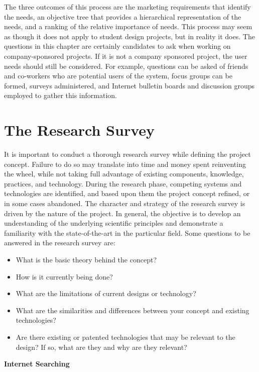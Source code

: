 The three outcomes of this process are the marketing requirements that
identify the needs, an objective tree that provides a hierarchical
representation of the needs, and a ranking of the relative importance of
needs. This process may seem as though it does not apply to student
design projects, but in reality it does. The questions in this chapter
are certainly candidates to ask when working on company-sponsored
projects. If it is not a company sponsored project, the user needs
should still be considered. For example, questions can be asked of
friends and co-workers who are potential users of the system, focus
groups can be formed, surveys administered, and Internet bulletin boards
and discussion groups employed to gather this information.

\section{The Research Survey}
\label{section:the-research-survey}

It is important to conduct a thorough research survey while defining the
project concept. Failure to do so may translate into time and money
spent reinventing the wheel, while not taking full advantage of existing
components, knowledge, practices, and technology. During the research
phase, competing systems and technologies are identified, and based upon
them the project concept refined, or in some cases abandoned. The
character and strategy of the research survey is driven by the nature of
the project. In general, the objective is to develop an understanding of
the underlying scientific principles and demonstrate a familiarity with
the state-of-the-art in the particular field. Some questions to be
answered in the research survey are:

\begin{itemize}
\item
  What is the basic theory behind the concept?
\item
  How is it currently being done?
\item
  What are the limitations of current designs or technology?
\item
  What are the similarities and differences between your concept and
  existing technologies?
\item
  Are there existing or patented technologies that may be relevant to
  the design? If so, what are they and why are they relevant?
\end{itemize}

\textbf{Internet Searching}

